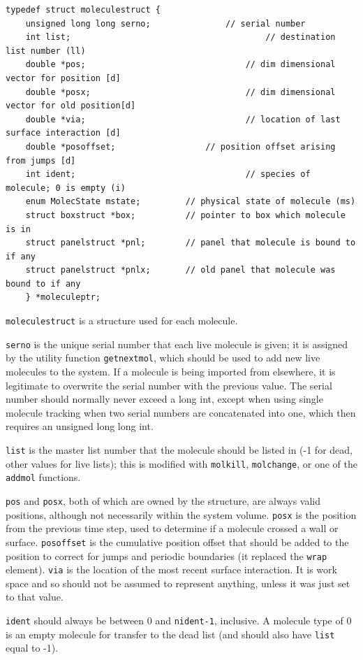 \documentclass {scrbook}
\newcommand {\ttt} {\texttt}
\begin{document}
\begin{lstlisting}
typedef struct moleculestruct {
	unsigned long long serno;				// serial number
	int list;										// destination list number (ll)
	double *pos;								// dim dimensional vector for position [d]
	double *posx;								// dim dimensional vector for old position[d]
	double *via;								// location of last surface interaction [d]
	double *posoffset;					// position offset arising from jumps [d]
	int ident;									// species of molecule; 0 is empty (i)
	enum MolecState mstate;			// physical state of molecule (ms)
	struct boxstruct *box;			// pointer to box which molecule is in
	struct panelstruct *pnl;		// panel that molecule is bound to if any
	struct panelstruct *pnlx;		// old panel that molecule was bound to if any
	} *moleculeptr;
\end{lstlisting}

\ttt{moleculestruct} is a structure used for each molecule.

\ttt{serno} is the unique serial number that each live molecule is given; it is assigned by the utility function \ttt{getnextmol}, which should be used to add new live molecules to the system. If a molecule is being imported from elsewhere, it is legitimate to overwrite the serial number with the previous value. The serial number should normally never exceed a long int, except when using single molecule tracking when two serial numbers are concatenated into one, which then requires an unsigned long long int.

\ttt{list} is the master list number that the molecule should be listed in (-1 for dead, other values for live lists); this is modified with \ttt{molkill}, \ttt{molchange}, or one of the \ttt{addmol} functions.

\ttt{pos} and \ttt{posx}, both of which are owned by the structure, are always valid positions, although not necessarily within the system volume. \ttt{posx} is the position from the previous time step, used to determine if a molecule crossed a wall or surface. \ttt{posoffset} is the cumulative position offset that should be added to the position to correct for jumps and periodic boundaries (it replaced the \ttt{wrap} element). \ttt{via} is the location of the most recent surface interaction. It is work space and so should not be assumed to represent anything, unless it was just set to that value.

\ttt{ident} should always be between 0 and \ttt{nident-1}, inclusive. A molecule type of 0 is an empty molecule for transfer to the dead list (and should also have \ttt{list} equal to -1).
\end{document}
